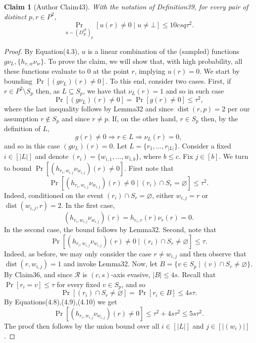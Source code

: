\documentclass[10pt,a4paper]{article}
\newtheorem{ntclaim}[nttheorem]{Claim}
\begin{document}
\begin{ntclaim}[Author Claim43]
With the notation of Definition39, for every pair of distinct $p,r\in P^2$,
\[\Pr_{u\sim(D_{\mathcal R}^{P^2})_p}[u(r)\ne0\mid u\ne\bot]\leq10csq\tau^2.\]
\end{ntclaim}
\begin{proof}
By Equation(4.3), $u$ is a linear combination of the (sampled) functions $g\nu_L,\{h_{r,w}\nu_w\}$. To prove the claim, we will show that, with high probability, all these functions evaluate to $0$ at the point $r$, implying $u(r)=0$. We start by bounding $\Pr[(g\nu_L)(r)\ne0]$. To this end, consider two cases. First, if $r\in P^2\setminus S_p$ then, as $L\subseteq S_p$, we have that $\nu_L(r)=1$ and so in such case
\begin{equation}\Pr[(g\nu_L)(r)\ne0]=\Pr[g(r)\ne0]\leq\tau^2,\tag{4.7}\end{equation}
where the last inequality follows by Lemma32 and since $\operatorname{dist}(r,p)=2$ per our assumption $r\notin S_p$ and since $r\ne p$. If, on the other hand, $r\in S_p$ then, by the definition of $L$,
\[g(r)\ne0\Longrightarrow r\in L\Longrightarrow\nu_L(r)=0,\]
and so in this case $(g\nu_L)(r)=0$.
Let $L=\{r_1,\ldots,r_{|L|}\}$. Consider a fixed $i\in[|L|]$ and denote $(r_i)=\{w_{i,1},\ldots,w_{i,b}\}$, where $b\leq c$. Fix $j\in[b]$. We turn to bound $\Pr[(h_{r_i,w_{i,j}}\nu_{w_{i,j}})(r)\ne0]$. First note that
\begin{equation}\Pr[(h_{r_i,w_{i,j}}\nu_{w_{i,j}})(r)\ne0\mid(r_i)\cap S_r=\varnothing]\leq\tau^2.\tag{4.8}\end{equation}
Indeed, conditioned on the event $(r_i)\cap S_r=\varnothing$, either $w_{i,j}=r$ or $\operatorname{dist}(w_{i,j},r)=2$. In the first case,
\[(h_{r_i,w_{i,j}}\nu_{w_{i,j}})(r)=h_{r_i,r}(r)\nu_r(r)=0.\]
In the second case, the bound follows by Lemma32. Second, note that
\begin{equation}\Pr[(h_{r_i,w_{i,j}}\nu_{w_{i,j}})(r)\ne0\mid(r_i)\cap S_r\ne\varnothing]\leq\tau.\tag{4.9}\end{equation}
Indeed, as before, we may only consider the case $r\ne w_{i,j}$ and then observe that $\operatorname{dist}(r,w_{i,j})=1$ and invoke Lemma32. Now, let $B=\{v\in S_p\mid(v)\cap S_r\ne\varnothing\}$. By Claim36, and since $\mathcal R$ is $(c,s)$-axis evasive, $|B|\leq4s$. Recall that $\Pr[r_i=v]\leq\tau$ for every fixed $v\in S_p$, and so
\begin{equation}\Pr[(r_i)\cap S_r\ne\varnothing]=\Pr[r_i\in B]\leq4s\tau.\tag{4.10}\end{equation}
By Equations(4.8),(4.9),(4.10) we get
\[\Pr[(h_{r_i,w_{i,j}}\nu_{w_{i,j}})(r)\ne0]\leq\tau^2+4s\tau^2\leq5s\tau^2.\]
The proof then follows by the union bound over all $i\in[|L|]$ and $j\in[|(w_i)|]$.
\end{proof}
\end{document}
